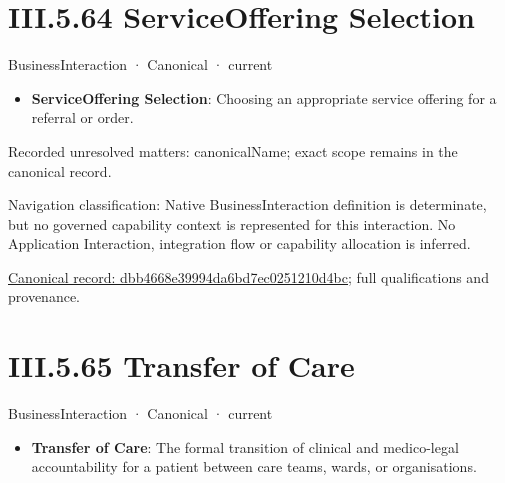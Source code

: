 \section*{III.5.64 ServiceOffering Selection}
\label{navigation:III.5.64}

\label{element:dbb4668e39994da6bd7ec0251210d4bc}
{\small BusinessInteraction · Canonical · current}\par

\begin{itemize}


\item \textbf{ServiceOffering Selection}: Choosing an appropriate service offering for a referral or order.

\end{itemize}

{\small Recorded unresolved matters: canonicalName; exact scope remains in the canonical record.}\par
{\small Navigation classification: Native BusinessInteraction definition is determinate, but no governed capability context is represented for this interaction. No Application Interaction, integration flow or capability allocation is inferred.}\par
{\footnotesize \href{../../../../../../../continuum/business/business-interaction/dbb4668e39994da6bd7ec0251210d4bc.md}{Canonical record: dbb4668e39994da6bd7ec0251210d4bc}; full qualifications and provenance.}\par
\section*{III.5.65 Transfer of Care}
\label{navigation:III.5.65}

\label{element:8bb02a34807f4bb183bb42a722f4509b}
{\small BusinessInteraction · Canonical · current}\par

\begin{itemize}


\item \textbf{Transfer of Care}: The formal transition of clinical and medico-legal accountability for a patient between care teams, wards, or organisations.

\end{itemize}

